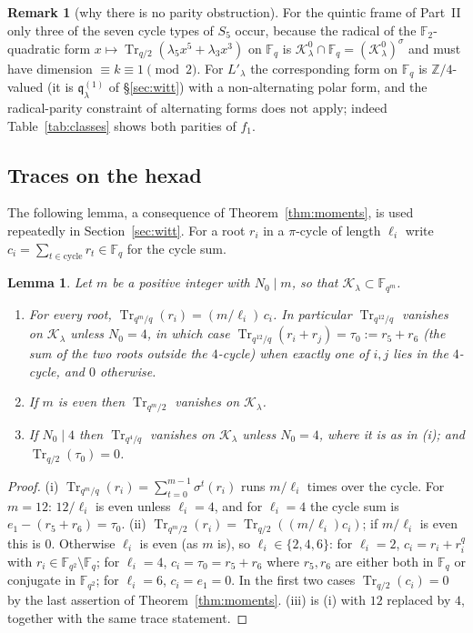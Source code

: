 \documentclass[12pt,a4paper]{amsart}
\newtheorem{lemma}[theorem]{Lemma}
\theoremstyle{definition}
\newtheorem{remark}[theorem]{Remark}
\newcommand{\F}{\mathbb{F}}
\newcommand{\Z}{\mathbb{Z}}
\newcommand{\Tr}{\operatorname{Tr}}
\newcommand{\Kk}{\mathcal{K}}
\newcommand{\qq}{\mathfrak{q}}
\begin{document}
\begin{remark}[why there is no parity obstruction]
For the quintic frame of Part~II only three of the seven cycle types of $S_5$ occur, because the radical of the $\F_2$-quadratic form $x\mapsto\Tr_{q/2}(\lambda_5x^5+\lambda_3x^3)$ on $\F_q$ is $\Kk^0_\lambda\cap\F_q=(\Kk^0_\lambda)^\sigma$ and must have dimension $\equiv k\equiv1\pmod 2$. For $L'_\lambda$ the corresponding form on $\F_q$ is $\Z/4$-valued (it is $\qq^{(1)}_\lambda$ of \S\ref{sec:witt}) with a non-alternating polar form, and the radical-parity constraint of alternating forms does not apply; indeed Table~\ref{tab:classes} shows both parities of $f_1$.
\end{remark}

\subsection{Traces on the hexad}
The following lemma, a consequence of Theorem~\ref{thm:moments}, is used repeatedly in Section~\ref{sec:witt}. For a root $r_i$ in a $\pi$-cycle of length $\ell_i$ write $c_i=\sum_{t\in\text{cycle}}r_t\in\F_q$ for the cycle sum.

\begin{lemma}\label{lem:traces}
Let $m$ be a positive integer with $N_0\mid m$, so that $\Kk_\lambda\subset\F_{q^m}$.
\begin{enumerate}[label=\textup{(\roman*)},leftmargin=2em]
\item For every root, $\Tr_{q^m/q}(r_i)=(m/\ell_i)\,c_i$. In particular $\Tr_{q^{12}/q}$ vanishes on $\Kk_\lambda$ unless $N_0=4$, in which case $\Tr_{q^{12}/q}(r_i+r_j)=\tau_0:=r_5+r_6$ (the sum of the two roots outside the $4$-cycle) when exactly one of $i,j$ lies in the $4$-cycle, and $0$ otherwise.
\item If $m$ is even then $\Tr_{q^m/2}$ vanishes on $\Kk_\lambda$.
\item If $N_0\mid4$ then $\Tr_{q^4/q}$ vanishes on $\Kk_\lambda$ unless $N_0=4$, where it is as in \textup{(i)}; and $\Tr_{q/2}(\tau_0)=0$.
\end{enumerate}
\end{lemma}
\begin{proof}
(i) $\Tr_{q^m/q}(r_i)=\sum_{t=0}^{m-1}\sigma^t(r_i)$ runs $m/\ell_i$ times over the cycle. For $m=12$: $12/\ell_i$ is even unless $\ell_i=4$, and for $\ell_i=4$ the cycle sum is $e_1-(r_5+r_6)=\tau_0$. (ii) $\Tr_{q^m/2}(r_i)=\Tr_{q/2}((m/\ell_i)c_i)$; if $m/\ell_i$ is even this is $0$. Otherwise $\ell_i$ is even (as $m$ is), so $\ell_i\in\{2,4,6\}$: for $\ell_i=2$, $c_i=r_i+r_i^q$ with $r_i\in\F_{q^2}\setminus\F_q$; for $\ell_i=4$, $c_i=\tau_0=r_5+r_6$ where $r_5,r_6$ are either both in $\F_q$ or conjugate in $\F_{q^2}$; for $\ell_i=6$, $c_i=e_1=0$. In the first two cases $\Tr_{q/2}(c_i)=0$ by the last assertion of Theorem~\ref{thm:moments}. (iii) is (i) with $12$ replaced by $4$, together with the same trace statement.
\end{proof}
\end{document}
